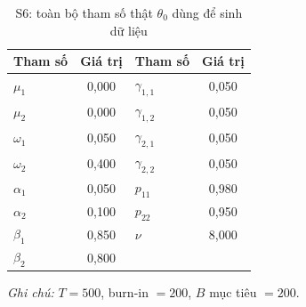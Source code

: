 \documentclass[11pt,a4paper]{article}
\begin{document}
\begin{table}[H]\centering\small
\caption{S6: toàn bộ tham số thật $\theta_0$ dùng để sinh dữ liệu}
\begin{tabularx}{\textwidth}{l C  l C}
\toprule
\textbf{Tham số} & \textbf{Giá trị} & \textbf{Tham số} & \textbf{Giá trị} \\
\midrule
$\mu_1$ & 0{,}000 & $\gamma_{1,1}$ & 0{,}050 \\
$\mu_2$ & 0{,}000 & $\gamma_{1,2}$ & 0{,}050 \\
$\omega_1$ & 0{,}050 & $\gamma_{2,1}$ & 0{,}050 \\
$\omega_2$ & 0{,}400 & $\gamma_{2,2}$ & 0{,}050 \\
$\alpha_1$ & 0{,}050 & $p_{11}$ & 0{,}980 \\
$\alpha_2$ & 0{,}100 & $p_{22}$ & 0{,}950 \\
$\beta_1$ & 0{,}850 & $\nu$ & 8{,}000 \\
$\beta_2$ & 0{,}800 & & \\
\bottomrule
\end{tabularx}
\vspace{0.2em}\raggedright\scriptsize \emph{Ghi chú:} $T=500$, burn-in $=200$, $B$ mục tiêu $=200$.
\end{table}
\end{document}
